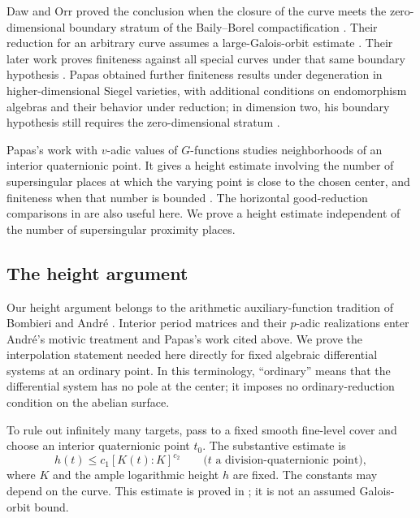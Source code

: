 Daw and Orr proved the conclusion when the closure of the curve meets the zero-dimensional boundary stratum of the Baily--Borel compactification \cite[Theorem~1.4]{DawOrr2022}. Their reduction for an arbitrary curve assumes a large-Galois-orbit estimate \cite[Theorem~1.3 and Conjecture~6.2]{DawOrr2022}. Their later work proves finiteness against all special curves under that same boundary hypothesis \cite[Corollary~1.2]{DawOrrMultiplicative2025}. Papas obtained further finiteness results under degeneration in higher-dimensional Siegel varieties, with additional conditions on endomorphism algebras and their behavior under reduction; in dimension two, his boundary hypothesis still requires the zero-dimensional stratum \cite[Theorem~1.4]{Papas2024}.

Papas's work with \(v\)-adic values of \(G\)-functions studies neighborhoods of an interior quaternionic point. It gives a height estimate involving the number of supersingular places at which the varying point is close to the chosen center, and finiteness when that number is bounded \cite[Theorem~1.7 and Corollary~1.9]{PapasIII2025}. The horizontal good-reduction comparisons in \cite[Theorem~3.4]{PapasI2025} are also useful here. We prove a height estimate independent of the number of supersingular proximity places.

\subsection{The height argument}

Our height argument belongs to the arithmetic auxiliary-function
tradition of Bombieri and Andr\'e \cite{Bombieri1981,Andre1989}.
Interior period matrices and their $p$-adic realizations enter
Andr\'e's motivic treatment \cite{Andre1995} and Papas's work cited
above.  We prove the interpolation statement needed here directly
for fixed algebraic differential systems at an ordinary point.
In this terminology, ``ordinary'' means that the differential
system has no pole at the center; it imposes no ordinary-reduction
condition on the abelian surface.

To rule out infinitely many targets, pass to a fixed smooth fine-level cover and choose an interior quaternionic point \(t_0\). The substantive estimate is
\begin{equation}\label{eq:intro-height}
 h(t)\le c_1[K(t):K]^{c_2}
 \qquad\bigl(t\text{ a division-quaternionic point}\bigr),
\end{equation}
where \(K\) and the ample logarithmic height \(h\) are fixed. The constants may depend on the curve. This estimate is proved in ; it is not an assumed Galois-orbit bound.

